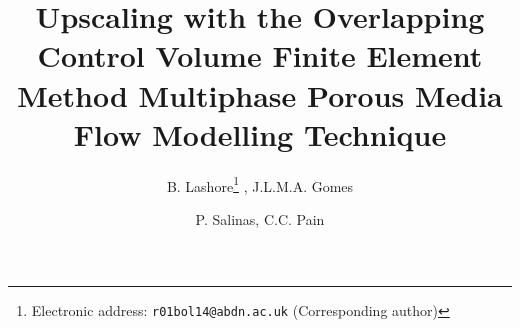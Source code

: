 \documentclass{article}
\begin{document}
\title{Upscaling with the Overlapping Control Volume Finite Element Method Multiphase Porous Media Flow Modelling Technique}


\author{B. Lashore\thanks{Electronic address: \texttt{r01bol14@abdn.ac.uk} (Corresponding author)} , J.L.M.A. Gomes}

\author{P. Salinas, C.C. Pain}

\end{document}
